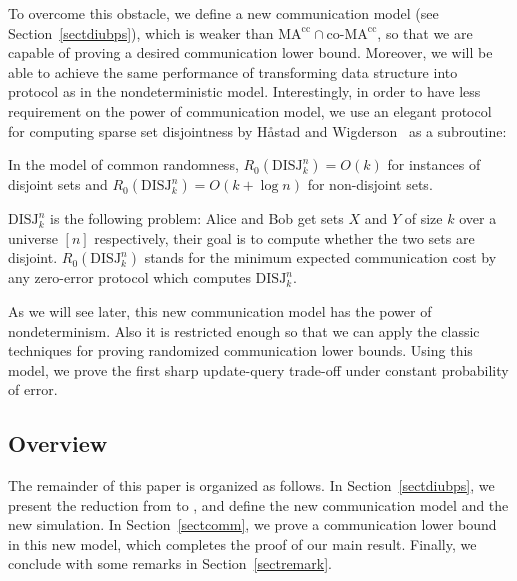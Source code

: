 \documentclass[11pt]{article}
\begin{document}
To overcome this obstacle, we define a new communication model (see Section~\ref{sectdiubps}), which is weaker than $\mathrm{MA^{cc}}\cap \textrm{co-}\mathrm{MA^{cc}}$, so that we are capable of proving a desired communication lower bound. Moreover, we will be able to achieve the same performance of transforming data structure into protocol as in the nondeterministic model. Interestingly, in order to have less requirement on the power of communication model, we use an elegant protocol for computing sparse set disjointness by H\aa{}stad and Wigderson~\cite{HW07} as a subroutine:

\begin{theorem}\label{thmsparse}
In the model of common randomness, $R_0(\mathrm{DISJ}^n_k) = O(k)$ for instances of disjoint sets and $R_0(\mathrm{DISJ}^n_k) = O(k+\log n)$ for non-disjoint sets.
\end{theorem}

$\mathrm{DISJ}^n_k$ is the following problem: Alice and Bob get sets $X$ and $Y$ of size $k$ over a universe $[n]$ respectively, their goal is to compute whether the two sets are disjoint. $R_0(\mathrm{DISJ}^n_k)$ stands for the minimum expected communication cost by any zero-error protocol which computes $\mathrm{DISJ}^n_k$. 

As we will see later, this new communication model has the power of nondeterminism. Also it is restricted enough so that we can apply the classic techniques for proving randomized communication lower bounds. Using this model, we prove the first sharp update-query trade-off under constant probability of error. 

\subsection{Overview}
The remainder of this paper is organized as follows. In Section~\ref{sectdiubps}, we present the reduction from \bps{} to \diu{}, and define the new communication model and the new simulation. In Section~\ref{sectcomm}, we prove a communication lower bound in this new model, which completes the proof of our main result. \iftoggle{conf}{Some proof details and the applications of our main theorem to dynamic graph problems can be found in the full version. }{In Section~\ref{sectapp}, we apply the main theorem to several dynamic graph problems. }Finally, we conclude with some remarks in Section~\ref{sectremark}.
\end{document}

